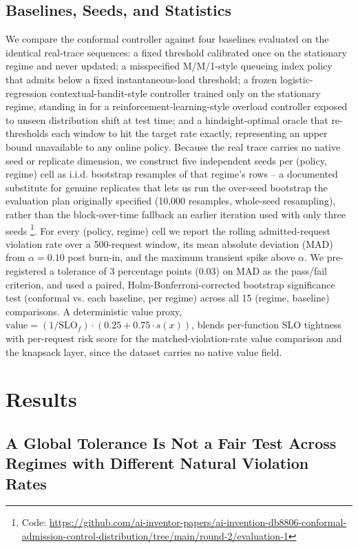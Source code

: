 \documentclass[11pt,letterpaper]{article}
\begin{document}
\subsection{Baselines, Seeds, and Statistics}

We compare the conformal controller against four baselines evaluated on the identical real-trace sequences: a fixed threshold calibrated once on the stationary regime and never updated; a misspecified M/M/1-style queueing index policy that admits below a fixed instantaneous-load threshold; a frozen logistic-regression contextual-bandit-style controller trained only on the stationary regime, standing in for a reinforcement-learning-style overload controller exposed to unseen distribution shift at test time; and a hindsight-optimal oracle that re-thresholds each window to hit the target rate exactly, representing an upper bound unavailable to any online policy. Because the real trace carries no native seed or replicate dimension, we construct five independent seeds per (policy, regime) cell as i.i.d. bootstrap resamples of that regime's rows -- a documented substitute for genuine replicates that lets us run the over-seed bootstrap the evaluation plan originally specified (10,000 resamples, whole-seed resampling), rather than the block-over-time fallback an earlier iteration used with only three seeds \footnote{Code: \url{https://github.com/ai-inventor-papers/ai-invention-db8806-conformal-admission-control-distribution/tree/main/round-2/evaluation-1}}. For every (policy, regime) cell we report the rolling admitted-request violation rate over a 500-request window, its mean absolute deviation (MAD) from $\alpha = 0.10$ post burn-in, and the maximum transient spike above $\alpha$. We pre-registered a tolerance of 3 percentage points (0.03) on MAD as the pass/fail criterion, and used a paired, Holm-Bonferroni-corrected bootstrap significance test (conformal vs. each baseline, per regime) across all 15 (regime, baseline) comparisons. A deterministic value proxy, $\mathrm{value} = (1/\mathrm{SLO}_f) \cdot (0.25 + 0.75 \cdot s(x))$, blends per-function SLO tightness with per-request risk score for the matched-violation-rate value comparison and the knapsack layer, since the dataset carries no native value field.

\section{Results}

\subsection{A Global Tolerance Is Not a Fair Test Across Regimes with Different Natural Violation Rates}
\end{document}
